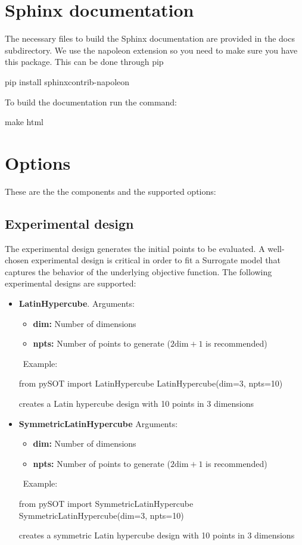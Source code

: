 \documentclass[]{article}
\begin{document}
\section{Sphinx documentation}
The necessary files to build the Sphinx documentation are provided in the docs subdirectory. We use the napoleon extension so you need to make sure you have this package. This can be done through pip
\begin{python}
pip install sphinxcontrib-napoleon
\end{python}
To build the documentation run the command:
\begin{python}
make html
\end{python}


\section{Options}
These are the the components and the supported options:
\subsection{Experimental design} The experimental design generates the initial points to be evaluated. A well-chosen experimental design is critical in order to fit a Surrogate model that captures the behavior of the underlying objective function. The following experimental designs are supported:
\begin{itemize}
\item \textbf{LatinHypercube}. Arguments:
\begin{itemize}
\item \textbf{dim:} Number of dimensions
\item \textbf{npts:} Number of points to generate ($2 \text{dim}+1$ is recommended)
\end{itemize} 
\ \newline Example: 
\begin{python}
from pySOT import LatinHypercube
LatinHypercube(dim=3, npts=10)
\end{python}
creates a Latin hypercube design with 10 points in 3 dimensions
\item \textbf{SymmetricLatinHypercube} Arguments:
\begin{itemize}
\item \textbf{dim:} Number of dimensions
\item \textbf{npts:} Number of points to generate ($2 \text{dim}+1$ is recommended)
\end{itemize}
\ \newline Example: 
\begin{python}
from pySOT import SymmetricLatinHypercube
SymmetricLatinHypercube(dim=3, npts=10)
\end{python}
creates a symmetric Latin hypercube design with 10 points in 3 dimensions

\end{itemize}
\end{document}

